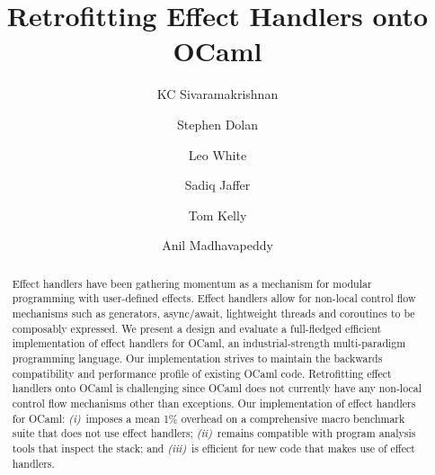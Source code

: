 \documentclass[sigplan,screen]{acmart}
\begin{document}
\title{Retrofitting Effect Handlers onto OCaml}

\author{KC Sivaramakrishnan}

\author{Stephen Dolan}

\author{Leo White}

\author{Sadiq Jaffer}

\author{Tom Kelly}

\author{Anil Madhavapeddy}

\begin{abstract}
Effect handlers have been gathering momentum as a mechanism for modular
	programming with user-defined effects. Effect handlers allow for non-local
	control flow mechanisms such as generators, async/await, lightweight threads
	and coroutines to be composably expressed.  We present a design and evaluate
	a full-fledged efficient implementation of effect handlers for OCaml, an
	industrial-strength multi-paradigm programming language. Our implementation
	strives to maintain the backwards compatibility and performance profile of
	existing OCaml code. Retrofitting effect handlers onto OCaml is challenging
	since OCaml does not currently have any non-local control flow mechanisms
	other than exceptions. Our implementation of effect handlers for OCaml: {\em
	(i)}~imposes a mean 1\% overhead on a comprehensive macro benchmark suite
	that does not use effect handlers; {\em (ii)}~remains compatible with program
	analysis tools that inspect the stack; and {\em (iii)}~is efficient for new
	code that makes use of effect handlers.
\end{abstract}
\end{document}
